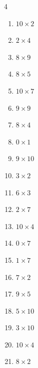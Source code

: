 \begin{multicols}{4}
\begin{enumerate}
  \item $10\times 2$
        \phantom{$=20$}

  \item $2\times 4$
        \phantom{$=8$}

  \item $8\times 9$
        \phantom{$=72$}

  \item $8\times 5$
        \phantom{$=40$}

  \item $10\times 7$
        \phantom{$=70$}

  \item $9\times 9$
        \phantom{$=81$}

  \item $8\times 4$
        \phantom{$=32$}

  \item $0\times 1$
        \phantom{$=0$}

  \item $9\times 10$
        \phantom{$=90$}

  \item $3\times 2$
        \phantom{$=6$}

  \item $6\times 3$
        \phantom{$=18$}

  \item $2\times 7$
        \phantom{$=14$}

  \item $10\times 4$
        \phantom{$=40$}

  \item $0\times 7$
        \phantom{$=0$}

  \item $1\times 7$
        \phantom{$=7$}

  \item $7\times 2$
        \phantom{$=14$}

  \item $9\times 5$
        \phantom{$=45$}

  \item $5\times 10$
        \phantom{$=50$}

  \item $3\times 10$
        \phantom{$=30$}

  \item $10\times 4$
        \phantom{$=40$}

  \item $8\times 2$
        \phantom{$=16$}


\end{enumerate}
\end{multicols}

